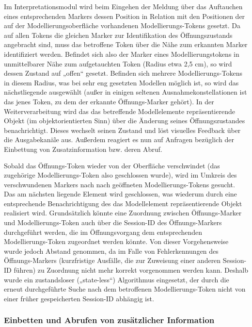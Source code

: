 Im Interpretationsmodul wird beim Eingehen der Meldung über das Auftauchen eines entsprechenden Markers dessen Position in Relation mit den Positionen der auf der Modellierungsoberfläche vorhandenen Modellierungs-Tokens gesetzt. Da auf allen Tokens die gleichen Marker zur Identifikation des Öffnungszustands angebracht sind, muss das betroffene Token über die Nähe zum erkannten Marker identifiziert werden. Befindet sich also der Marker eines Modellierungstokens in unmittelbarer Nähe zum aufgetauchten Token (Radius etwa 2,5 cm), so wird dessen Zustand auf „offen“ gesetzt. Befinden sich mehrere Modellierungs-Tokens in diesem Radius, was bei sehr eng gesetzten Modellen möglich ist, so wird das nächstliegende ausgewählt (außer in einigen seltenen Ausnahmekonstellationen ist das jenes Token, zu dem der erkannte Öffnungs-Marker gehört). In der Weiterverarbeitung wird das das betreffende Modellelemente repräsentierende Objekt (im objektorientierten Sinn) über die Änderung seines Öffnungszustandes benachrichtigt. Dieses wechselt seinen Zustand und löst visuelles Feedback über die Ausgabekanäle aus. Außerdem reagiert es nun auf Anfragen bezüglich der Einbettung von Zusatzinformation bzw. deren Abruf.

Sobald das Öffnungs-Token wieder von der Oberfläche verschwindet (das zugehörige Modellierungs-Token also geschlossen wurde), wird im Umkreis des verschwundenen Markers nach nach geöffneten Modellierungs-Tokens gesucht. Das am nächsten liegende Element wird geschlossen, was wiederum durch eine entsprechende Benachrichtigung des das Modellelement repräsentierende Objekt realisiert wird. Grundsätzlich könnte eine Zuordnung zwischen Öffnungs-Marker und Modellierungs-Token auch über die Session-ID des Öffnungs-Markers durchgeführt werden, die im Öffnungsvorgang dem entsprechenden Modellierungs-Token zugeordnet werden könnte. Von dieser Vorgehensweise wurde jedoch Abstand genommen, da im Falle von Fehlerkennungen des Öffnungs-Markers (kurzfristige Ausfälle, die zur Zuweisung einer anderen Session-ID führen) zu Zuordnung nicht mehr korrekt vorgenommen werden kann. Deshalb wurde ein zustandsloser („state-less“) Algorithmus eingesetzt, der durch die erneut durchgeführte Suche nach dem betroffenen Modellierungs-Token nicht von einer früher gespeicherten Session-ID abhängig ist.

\subsubsection{Einbetten und Abrufen von zusätzlicher Information} %
\label{ssub:einbetten_und_abrufen_von_eingebetteter_information}

